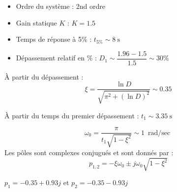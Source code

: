 \exercice{}



\question{}
\begin{itemize}
    \item Ordre du système : 2nd ordre 
    \item Gain statique $K$ : $K=1.5$ 
    \item Temps de réponse à 5\% : $t_{5\%}\sim\SI{8}{\second}$ 
    \item Dépassement relatif en \% : $D_1\sim\dfrac{1.96-1.5}{1.5}\sim30\%$ 
\end{itemize}

\question{}
\`A partir du dépassement : 
$$
\xi=\dfrac{\ln{D}}{\sqrt{\pi^2+(\ln{D})^2}}\sim0.35 
$$

\`A partir du temps du premier dépassement :
$t_1\sim\SI{3.35}{\second}$

$$
\omega_0=\dfrac{\pi}{t_1\sqrt{1-\xi^2}}\sim\SI{1}{\radian\per\sec} 
$$
\question{}
Les pôles sont complexes conjugués et sont donnés par : 
$$
p_{1,2}=-\xi\omega_0\pm j\omega_0\sqrt{1-\xi^2}
$$

$p_1=-0.35+0.93j$ et $p_2=-0.35-0.93j$

